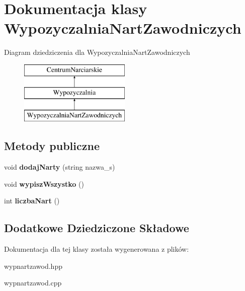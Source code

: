 \hypertarget{class_wypozyczalnia_nart_zawodniczych}{}\section{Dokumentacja klasy Wypozyczalnia\+Nart\+Zawodniczych}
\label{class_wypozyczalnia_nart_zawodniczych}
Diagram dziedziczenia dla Wypozyczalnia\+Nart\+Zawodniczych\begin{figure}[H]
\begin{center}
\leavevmode
\includegraphics[height=3.000000cm]{class_wypozyczalnia_nart_zawodniczych}
\end{center}
\end{figure}
\subsection*{Metody publiczne}
\begin{DoxyCompactItemize}
\item 
\mbox{\label{class_wypozyczalnia_nart_zawodniczych_a9c339169c48d6e6ef8310494cbfcf8de}} 
void {\bfseries dodaj\+Narty} (string nazwa\+\_\+s)
\item 
\mbox{\label{class_wypozyczalnia_nart_zawodniczych_a2bc434fdfbb3b3e48d063f7ca56c76be}} 
void {\bfseries wypisz\+Wszystko} ()
\item 
\mbox{\label{class_wypozyczalnia_nart_zawodniczych_adc1ebefbce7393486ccd50ba3274b804}} 
int {\bfseries liczba\+Nart} ()
\end{DoxyCompactItemize}
\subsection*{Dodatkowe Dziedziczone Składowe}


Dokumentacja dla tej klasy została wygenerowana z plików\+:\begin{DoxyCompactItemize}
\item 
wypnartzawod.\+hpp\item 
wypnartzawod.\+cpp\end{DoxyCompactItemize}
